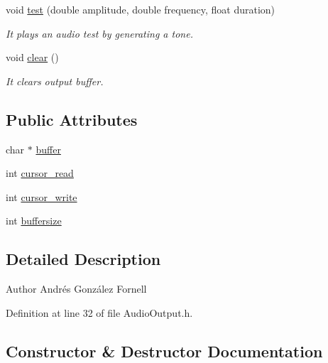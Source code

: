 \begin{DoxyCompactItemize}
void \hyperlink{class_output_device_a78e2163a6f7051d49d3483234003d684}{test} (double amplitude, double frequency, float duration)
\begin{DoxyCompactList}\small\item\em It plays an audio test by generating a tone. \end{DoxyCompactList}\item 
\mbox{\label{class_output_device_a9c3515a8c1812a08bd74d87389554767}} 
void \hyperlink{class_output_device_a9c3515a8c1812a08bd74d87389554767}{clear} ()
\begin{DoxyCompactList}\small\item\em It clears output buffer. \end{DoxyCompactList}\end{DoxyCompactItemize}
\subsection*{Public Attributes}
\begin{DoxyCompactItemize}
\item 
char $\ast$ \hyperlink{class_output_device_adf56f9d3e97d766a2e2b04c7bc743ee2}{buffer}
\item 
int \hyperlink{class_output_device_ab49ebf067d9b6f15f2305d5028cde85e}{cursor\+\_\+read}
\item 
int \hyperlink{class_output_device_ad770c7e5e833ccd9030382e16691f331}{cursor\+\_\+write}
\item 
int \hyperlink{class_output_device_a04e2fe4f9b7a15bf6993144d49f29461}{buffersize}
\end{DoxyCompactItemize}


\subsection{Detailed Description}
\begin{DoxyAuthor}{Author}
Andrés González Fornell 
\end{DoxyAuthor}


Definition at line 32 of file Audio\+Output.\+h.



\subsection{Constructor \& Destructor Documentation}
\mbox{\label{class_output_device_aa1e4dbe8403fb3fc022f71e3e3c26ee7}} 
